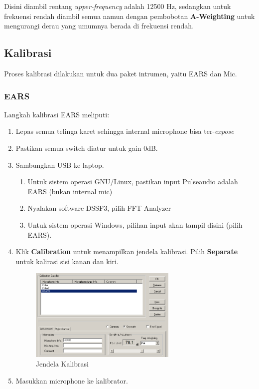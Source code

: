 \documentclass[12pt,]{article}
\begin{document}
	Disini diambil rentang \textit{upper-frequency} adalah 12500 Hz,
	sedangkan untuk frekuensi rendah diambil semua namun dengan pembobotan \textbf{A-Weighting}
	untuk mengurangi derau yang umumnya berada di frekuensi rendah.

	\subsection{Kalibrasi}

	Proses kalibrasi dilakukan untuk dua paket intrumen, yaitu EARS dan Mic.

	\subsubsection{EARS}

	Langkah kalibrasi EARS meliputi:
	\begin{enumerate}
		\item Lepas semua telinga karet sehingga internal microphone bisa ter-\textit{expose}
		\item Pastikan semua switch diatur untuk gain 0dB.
		\item Sambungkan USB ke laptop.
		\begin{enumerate}
			\item Untuk sistem operasi GNU/Linux, pastikan input Pulseaudio adalah EARS (bukan internal mic)
			\item Nyalakan software DSSF3, pilih FFT Analyzer
			\item Untuk sistem operasi Windows, pilihan input akan tampil disini (pilih EARS).
		\end{enumerate}
		\newpage
		\item Klik \textbf{Calibration} untuk menampilkan jendela kalibrasi.
		Pilih \textbf{Separate} untuk kalirasi sisi kanan dan kiri.
		\begin{figure}[!ht]
			\centering
			\includegraphics[width=200pt]{images/kalib}
			\caption{Jendela Kalibrasi}
		\end{figure}
		\item Masukkan microphone ke kalibrator.

\end{enumerate}
\end{document}
